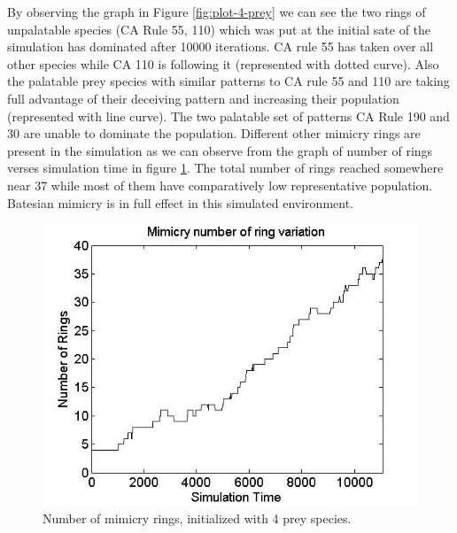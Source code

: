 By observing the graph in Figure \ref{fig:plot-4-prey} we can see the two rings of unpalatable species (CA Rule 55, 110) which was put at the initial sate of the simulation has dominated after 10000 iterations. CA rule 55 has taken over all other species while CA 110 is following it (represented with dotted curve). Also the palatable prey species with similar patterns to CA rule 55 and 110 are taking full advantage of their deceiving pattern and increasing their population (represented with line curve). The two palatable set of patterns CA Rule 190 and 30 are unable to dominate the population. Different other mimicry rings are present in the simulation as we can observe from the graph of number of rings verses simulation time in figure \ref{fig:ringSize10k-4Prey}. The total number of rings reached somewhere near 37 while most of them have comparatively low representative population. Batesian mimicry is in full effect in this simulated environment.

\begin{figure}[H]
	\centering
	\includegraphics[scale=0.50]{images/ringSize10k-4Prey}
	\caption[Number of mimicry rings (4 prey species)]{Number of mimicry rings, initialized with 4 prey species.}
	\label{fig:ringSize10k-4Prey}
\end{figure}

